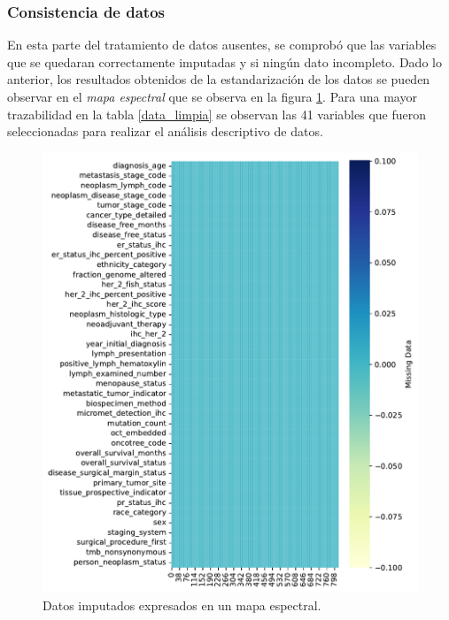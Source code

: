 \subsubsection{Consistencia de datos}
En esta parte del tratamiento de datos ausentes, se comprobó que las variables que se quedaran correctamente imputadas y si ningún dato incompleto. Dado lo anterior, los resultados obtenidos de la estandarización de los datos se pueden observar en el \textit{mapa espectral} que se observa en la figura \ref{impute_Spectrum}. Para una mayor trazabilidad en la tabla \ref{data_limpia} se observan las 41 variables que fueron seleccionadas para realizar el análisis descriptivo de datos.
\begin{figure}[htb!]
	\centering
	\includegraphics[width=0.85
	\linewidth]{NOTEBOOK/IMAGENES_PERDIDAS/impute_heatmap}
	\caption{Datos imputados expresados en un mapa espectral.}
	\label{impute_Spectrum}
\end{figure}


